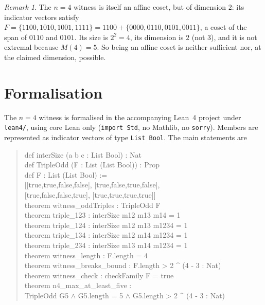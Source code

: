 \documentclass[11pt]{article}
\theoremstyle{definition}
\theoremstyle{remark}
\newtheorem{remark}[theorem]{Remark}
\begin{document}
\begin{remark}
The $n = 4$ witness is itself an affine coset, but of dimension $2$: its
indicator vectors satisfy
$F = \{1100, 1010, 1001, 1111\} = 1100 + \{0000, 0110, 0101, 0011\}$,
a coset of the span of $0110$ and $0101$. Its size is $2^2 = 4$, its dimension
is $2$ (not $3$), and it is not extremal because $M(4) = 5$. So being an affine
coset is neither sufficient nor, at the claimed dimension, possible.
\end{remark}

\section{Formalisation}

The $n = 4$ witness is formalised in the accompanying Lean~4 project under
\texttt{lean4/}, using core Lean only (\texttt{import Std}, no Mathlib, no
\texttt{sorry}). Members are represented as indicator vectors of type
\texttt{List Bool}. The main statements are

\begin{quote}\ttfamily
def interSize (a b c : List Bool) : Nat\\
def TripleOdd (F : List (List Bool)) : Prop\\
def F : List (List Bool) :=\\
\hspace*{2em}[[true,true,false,false], [true,false,true,false],\\
\hspace*{2em} [true,false,false,true], [true,true,true,true]]\\[2pt]
theorem witness\_oddTriples : TripleOdd F\\
theorem triple\_123 : interSize m12 m13 m14 = 1\\
theorem triple\_124 : interSize m12 m13 m1234 = 1\\
theorem triple\_134 : interSize m12 m14 m1234 = 1\\
theorem triple\_234 : interSize m13 m14 m1234 = 1\\
theorem witness\_length : F.length = 4\\
theorem witness\_breaks\_bound : F.length > 2 \^{} (4 - 3 : Nat)\\
theorem witness\_check : checkFamily F = true\\
theorem n4\_max\_at\_least\_five :\\
\hspace*{2em}TripleOdd G5 \(\wedge\) G5.length = 5 \(\wedge\) G5.length > 2 \^{} (4 - 3 : Nat)
\end{quote}
\end{document}

